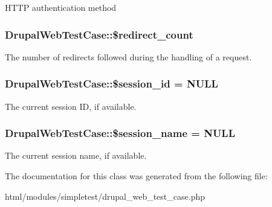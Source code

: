\label{classDrupalWebTestCase_a809845c0dd606b1e0511eb52ff8450da}
HTTP authentication method \hypertarget{classDrupalWebTestCase_a541a9f9c8bbb5fe5841544382ed6e29e}{
\subsubsection[{\$redirect\_\-count}]{\setlength{\rightskip}{0pt plus 5cm}DrupalWebTestCase::\$redirect\_\-count}}
\label{classDrupalWebTestCase_a541a9f9c8bbb5fe5841544382ed6e29e}
The number of redirects followed during the handling of a request. \hypertarget{classDrupalWebTestCase_a2f8ec9f9c31df56f5502f473e7b78e31}{
\subsubsection[{\$session\_\-id}]{\setlength{\rightskip}{0pt plus 5cm}DrupalWebTestCase::\$session\_\-id = NULL}}
\label{classDrupalWebTestCase_a2f8ec9f9c31df56f5502f473e7b78e31}
The current session ID, if available. \hypertarget{classDrupalWebTestCase_acb07ddaedaef0c5d08610666ec74cb45}{
\subsubsection[{\$session\_\-name}]{\setlength{\rightskip}{0pt plus 5cm}DrupalWebTestCase::\$session\_\-name = NULL}}
\label{classDrupalWebTestCase_acb07ddaedaef0c5d08610666ec74cb45}
The current session name, if available. 

The documentation for this class was generated from the following file:\begin{DoxyCompactItemize}
\item 
html/modules/simpletest/drupal\_\-web\_\-test\_\-case.php\end{DoxyCompactItemize}
